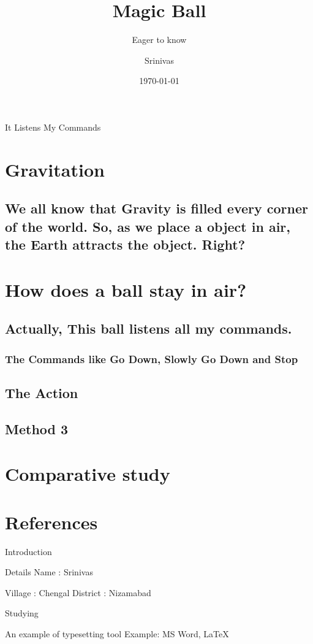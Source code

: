 \documentclass{beamer}
\title[Center texT]{Magic Ball}
\subtitle{Eager to know}
\author[Left text]{Srinivas}
\date[Right text]{\today}
\begin{document}
\begin{frame}
    \titlepage
\end{frame}

\begin{frame}{It Listens My Commands}
    \tableofcontents
\end{frame}

\section{Gravitation}
\subsection{
We all know that Gravity is filled every corner of the world. So, as we place a object in air, the Earth attracts the object. Right?}
\section{How does a ball stay in air?}
    \subsection{Actually, This ball listens all my commands.}
    \subsubsection{The Commands like Go Down, Slowly Go Down and Stop}
    \subsection{The Action}
    \subsubsection{}
    \subsection{Method 3}
\section{Comparative study}
\section{References}



\begin{frame}{Introduction}
    \begin{block}{Details}
        Name : Srinivas 
        
        Village : Chengal
        District : Nizamabad
    \end{block}
    \begin{alertblock}{Studying}
        
    \end{alertblock}
    \begin{exampleblock}{An example of typesetting tool}
        Example: MS Word, \LaTeX{}
    \end{exampleblock}
\end{frame}
\end{document}
